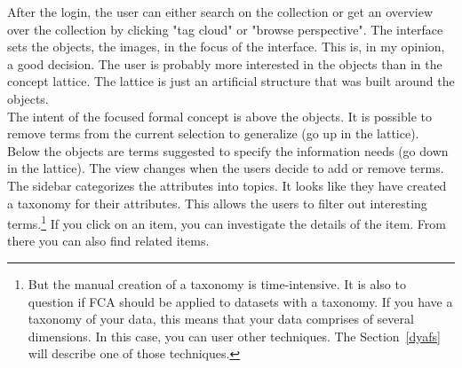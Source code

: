 \documentclass[11pt]{report}
\begin{document}
After the login, the user can either search on the collection or get an overview over the collection by clicking "tag cloud" or "browse perspective". The interface sets the objects, the images, in the focus of the interface. This is, in my opinion, a good decision. The user is probably more interested in the objects than in the concept lattice. The lattice is just an artificial structure that was built around the objects. \\
 
The intent of the focused formal concept is above the objects. It is possible to remove terms from the current selection to generalize (go up in the lattice). Below the objects are terms suggested to specify the information needs (go down in the lattice). The view changes when the users decide to add or remove terms. The sidebar categorizes the attributes into topics. It looks like they have created a taxonomy for their attributes. This allows the users to filter out interesting terms.\footnote{But the manual creation of a taxonomy is time-intensive. It is also to question if FCA should be applied to datasets with a taxonomy. If you have a taxonomy of your data, this means that your data comprises of several dimensions. In this case, you can user other techniques. The Section~\ref{dyafs} will describe one of those techniques.} If you click on an item, you can investigate the details of the item. From there you can also find related items.\\
 
\end{document}
